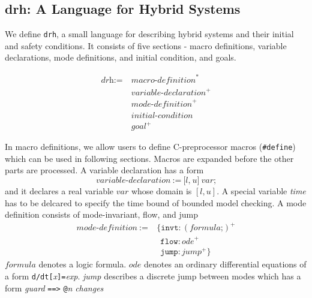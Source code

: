 \subsection{drh: A Language for Hybrid Systems}

We define \texttt{drh}, a small language for describing hybrid systems
and their initial and safety conditions. It consists of five sections
- macro definitions, variable declarations, mode definitions, and
initial condition, and goals.

\begin{align*}
  \textit{drh} := \ & \textit{macro-definition}^*\\
                  & \textit{variable-declaration}^+\\
                  & \textit{mode-definition}^+\\
                  & \textit{initial-condition}\\
                  & \textit{goal}^+
\end{align*}

In macro definitions, we allow users to define C-preprocessor macros
(\texttt{\#define}) which can be used in following sections. Macros
are expanded before the other parts are processed. A variable
declaration has a form
\[
\textit{variable-declaration} \ := \ \texttt{[}
                                     \textit{l}
                                     \texttt{,}
                                     \ \textit{u}
                                     \texttt{]}
                                     \ \textit{var}
                                     \texttt{;}
\]
and it declares a real variable $var$ whose domain is $[l, u]$. A special
variable \textit{time} has to be delcared to specify the time bound of
bounded model checking. A mode definition consists of mode-invariant,
flow, and jump
\begin{align*}
  \textit{mode-definition} \ := & \ \texttt{\{}
                                    \texttt{invt}:(\textit{formula} \texttt{;})^+\\
                           & \ \ \  \texttt{flow}:\textit{ode}^+\\
                           & \ \ \ \texttt{jump}:\textit{jump}^+ \texttt{\}}
\end{align*}
$\textit{formula}$ denotes a logic formula. $\textit{ode}$
denotes an ordinary differential equations of a form
\texttt{d/dt[}\textit{x}\texttt{]=}\textit{exp}. \textit{jump}
describes a discrete jump between modes which has a form
\textit{guard} \texttt{==>} \texttt{@}\textit{n} \textit{changes}

